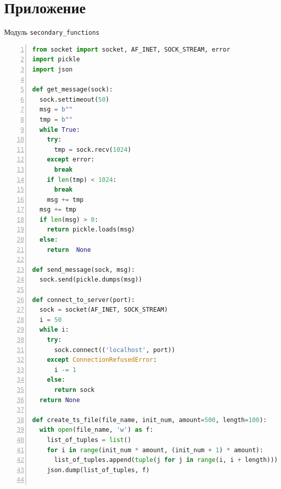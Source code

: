 \section*{Приложение}
\begin{ListingEnv}[H]\caption{Модуль \texttt{secondary\_functions}}\label{list:secfunc}
\begin{lstlisting}[language=Python, numbers=left]
from socket import socket, AF_INET, SOCK_STREAM, error
import pickle
import json

def get_message(sock):
  sock.settimeout(50)
  msg = b""
  tmp = b""
  while True:
	try:
	  tmp = sock.recv(1024)
	except error:
	  break
	if len(tmp) < 1024:
	  break
	msg += tmp
  msg += tmp
  if len(msg) > 0:
	return pickle.loads(msg)
  else:
	return  None

def send_message(sock, msg):
  sock.send(pickle.dumps(msg))

def connect_to_server(port):
  sock = socket(AF_INET, SOCK_STREAM)
  i = 50
  while i:
	try:
	  sock.connect(('localhost', port))
	except ConnectionRefusedError:
	  i -= 1
	else:
	  return sock
  return None

def create_ts_file(file_name, init_num, amount=500, length=100):
  with open(file_name, 'w') as f:
	list_of_tuples = list()
	for i in range(init_num * amount, (init_num + 1) * amount):
	  list_of_tuples.append(tuple(j for j in range(i, i + length)))
	json.dump(list_of_tuples, f)
	
	\end{lstlisting}
\end{ListingEnv}

